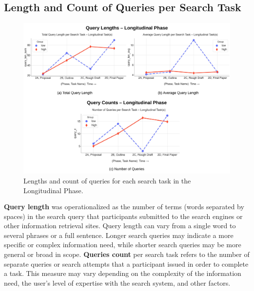 \documentclass[letterpaper, nobind]{templates/ociamthesis}
\begin{document}
\hypertarget{length-and-count-of-queries-per-search-task}{%
\subsection{Length and Count of Queries per Search Task}\label{length-and-count-of-queries-per-search-task}}

\begin{figure}

{\centering \includegraphics[width=1\linewidth]{figs/rp2-query-length-count} 

}

\caption[Query length and counts -- longitudinal phase.]{Lengths and count of queries for each search task in the Longitudinal Phase.}\label{fig:rp2-query-length-count}
\end{figure}





\textbf{Query length} was operationalized as the number of terms (words separated by spaces) in the search query that participants submitted to the search engines or other information retrieval sites.
Query length can vary from a single word to several phrases or a full sentence.
Longer search queries may indicate a more specific or complex information need, while shorter search queries may be more general or broad in scope.
\textbf{Queries count} per search task refers to the number of separate queries or search attempts that a participant issued in order to complete a task.
This measure may vary depending on the complexity of the information need, the user's level of expertise with the search system, and other factors.
\end{document}
